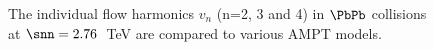 \begin{figure}[h]
\begin{center}
        \caption{The individual flow harmonics $v_n$ (n=2, 3 and 4) in $\PbPb$ collisions at $\snn=2.76$~TeV are compared to various AMPT models.}
        \label{fig:Figure_10}
              \end{center}
\end{figure}

